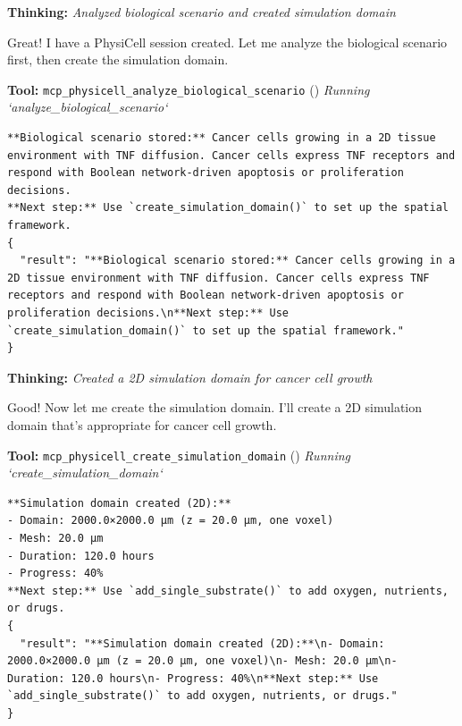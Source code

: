 \documentclass[11pt,a4paper]{article}
\begin{document}
\begin{thinkbox}
\textbf{Thinking:} \textit{Analyzed biological scenario and created simulation domain}

Great! I have a PhysiCell session created. Let me analyze the biological scenario first, then create the simulation domain.

\end{thinkbox}
\begin{toolokbox}
\textbf{Tool:} \texttt{mcp\_physicell\_analyze\_biological\_scenario} (\checkmark)
\textit{Running `analyze\_biological\_scenario`}
\begin{lstlisting}
**Biological scenario stored:** Cancer cells growing in a 2D tissue environment with TNF diffusion. Cancer cells express TNF receptors and respond with Boolean network-driven apoptosis or proliferation decisions.
**Next step:** Use `create_simulation_domain()` to set up the spatial framework.
{
  "result": "**Biological scenario stored:** Cancer cells growing in a 2D tissue environment with TNF diffusion. Cancer cells express TNF receptors and respond with Boolean network-driven apoptosis or proliferation decisions.\n**Next step:** Use `create_simulation_domain()` to set up the spatial framework."
}
\end{lstlisting}
\end{toolokbox}
\begin{thinkbox}
\textbf{Thinking:} \textit{Created a 2D simulation domain for cancer cell growth}

Good! Now let me create the simulation domain. I'll create a 2D simulation domain that's appropriate for cancer cell growth.

\end{thinkbox}
\begin{toolokbox}
\textbf{Tool:} \texttt{mcp\_physicell\_create\_simulation\_domain} (\checkmark)
\textit{Running `create\_simulation\_domain`}
\begin{lstlisting}
**Simulation domain created (2D):**
- Domain: 2000.0×2000.0 μm (z = 20.0 μm, one voxel)
- Mesh: 20.0 μm
- Duration: 120.0 hours
- Progress: 40%
**Next step:** Use `add_single_substrate()` to add oxygen, nutrients, or drugs.
{
  "result": "**Simulation domain created (2D):**\n- Domain: 2000.0×2000.0 μm (z = 20.0 μm, one voxel)\n- Mesh: 20.0 μm\n- Duration: 120.0 hours\n- Progress: 40%\n**Next step:** Use `add_single_substrate()` to add oxygen, nutrients, or drugs."
}
\end{lstlisting}
\end{toolokbox}
\end{document}
